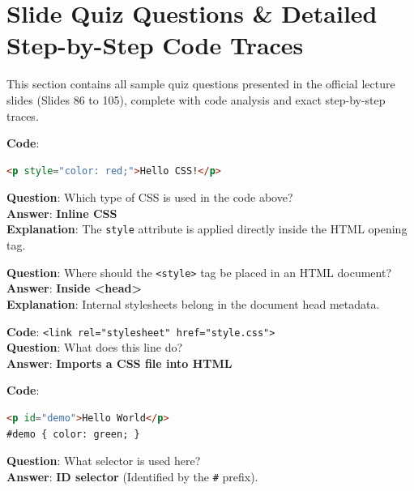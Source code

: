 \chapter{Slide Quiz Questions \& Detailed Step-by-Step Code Traces}

\noindent
This section contains all sample quiz questions presented in the official lecture slides (Slides 86 to 105), complete with code analysis and exact step-by-step traces.

\begin{quizbox}
\textbf{Code}:
\begin{lstlisting}[language=HTML]
<p style="color: red;">Hello CSS!</p>
\end{lstlisting}
\textbf{Question}: Which type of CSS is used in the code above?\\
\textbf{Answer}: \textbf{Inline CSS}\\
\textbf{Explanation}: The \texttt{style} attribute is applied directly inside the HTML opening tag.
\end{quizbox}

\begin{quizbox}
\textbf{Question}: Where should the \texttt{<style>} tag be placed in an HTML document?\\
\textbf{Answer}: \textbf{Inside <head>}\\
\textbf{Explanation}: Internal stylesheets belong in the document head metadata.
\end{quizbox}

\begin{quizbox}
\textbf{Code}: \texttt{<link rel="stylesheet" href="style.css">}\\
\textbf{Question}: What does this line do?\\
\textbf{Answer}: \textbf{Imports a CSS file into HTML}
\end{quizbox}

\begin{quizbox}
\textbf{Code}:
\begin{lstlisting}[language=HTML]
<p id="demo">Hello World</p>
#demo { color: green; }
\end{lstlisting}
\textbf{Question}: What selector is used here?\\
\textbf{Answer}: \textbf{ID selector} (Identified by the \texttt{\#} prefix).
\end{quizbox}

